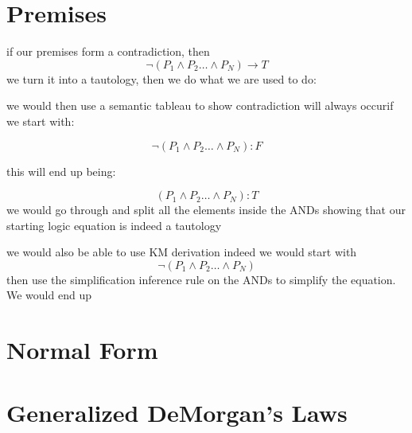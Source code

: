 \documentclass[a4paper,12pt]{article}
\begin{document}
\section{Premises}
if our premises form a contradiction, then
  \[ \lnot ( P_{1} \wedge P_{2} \dots \wedge P_{N}) \rightarrow T \]
we turn it into a tautology, then we do what we are used to do:

we would then use a semantic tableau to show contradiction will always occurif we start with:

  \[ \lnot ( P_{1} \wedge P_{2} \dots \wedge P_{N}) : F \]

this will end up being:

  \[ ( P_{1} \wedge P_{2} \dots \wedge P_{N}) : T\]
  we would go through and split all the elements inside the ANDs
  showing that our starting logic equation is indeed a tautology\\

\bigskip

we would also be able to use KM derivation
indeed we would start with
  \[ \lnot ( P_{1} \wedge P_{2} \dots \wedge P_{N}) \]
then use the simplification inference rule on the ANDs to simplify the equation.
We would end up 
\section{Normal Form}

\section{Generalized DeMorgan's Laws}
\end{document}
